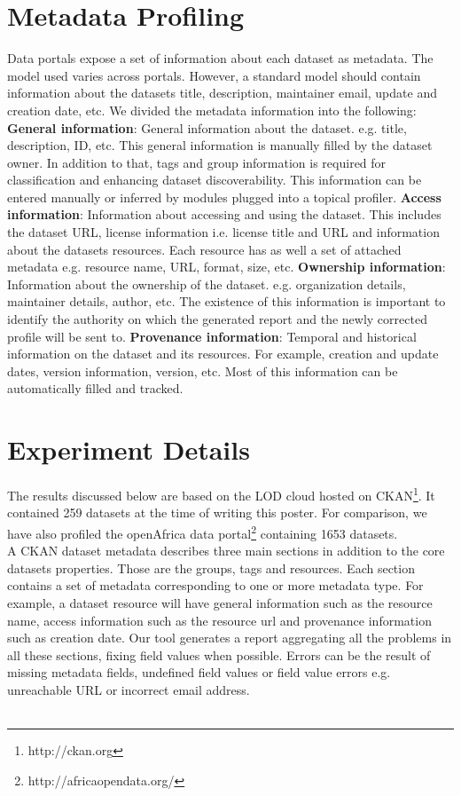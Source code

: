 \documentclass{sig-alternate}
\begin{document}
\section{Metadata Profiling}

Data portals expose a set of information about each dataset as metadata. The model used varies across portals. However, a standard model should contain information about the datasets title, description, maintainer email, update and creation date, etc. We divided the metadata information into the following:
\textbf{General information}: General information about the dataset. e.g. title, description, ID, etc. This general information is manually filled by the dataset owner. In addition to that, tags and group information is required for classification and enhancing dataset discoverability. This information can be entered manually or inferred by modules plugged into a topical profiler.
\textbf{Access information}: Information about accessing and using the dataset. This includes the dataset URL, license information i.e. license title and URL and information about the datasets resources. Each resource has as well a set of attached metadata e.g. resource name, URL, format, size, etc.
\textbf{Ownership information}: Information about the ownership of the dataset. e.g. organization details, maintainer details, author, etc. The existence of this information is important to identify the authority on which the generated report and the newly corrected profile will be sent to.
\textbf{Provenance information}: Temporal and historical information on the dataset and its resources. For example, creation and update dates, version information, version, etc. Most of this information can be automatically filled and tracked.

\section{Experiment Details}
The results discussed below are based on the LOD cloud hosted on CKAN\footnote{http://ckan.org}. It contained 259 datasets at the time of writing this poster. For comparison, we have also profiled the openAfrica data portal\footnote{http://africaopendata.org/} containing 1653 datasets.\\
A CKAN dataset metadata describes three main sections in addition to the core datasets properties. Those are the groups, tags and resources. Each section contains a set of metadata corresponding to one or more metadata type. For example, a dataset resource will have general information such as the resource name, access information such as the resource url and provenance information such as creation date. Our tool generates a report aggregating all the problems in all these sections, fixing field values when possible. Errors can be the result of missing metadata fields, undefined field values or field value errors e.g. unreachable URL or incorrect email address.\\\\
\end{document}
